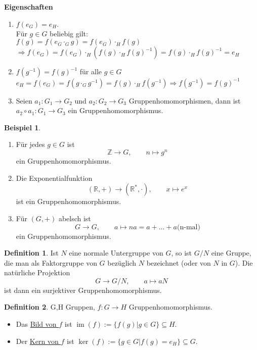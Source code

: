 \documentclass[12pt]{scrartcl}%
\theoremstyle{definition}
\newtheorem*{defn}{Definition}
\newtheorem{ex}{Beispiel}
\theoremstyle{remark}
\DeclareMathOperator\im{im}
\begin{document}
\textbf{Eigenschaften}
\begin{enumerate}
\item $f(e_G)=e_H.$\\
Für $g\in G$ beliebig gilt:\\
$f(g)=f(e_{G}\cdot_{G}g)=f(e_G)\cdot_{H}f(g)$\\
$\Rightarrow f(e_G)=f(e_G)\cdot_{H}(f(g)\cdot_{H}f(g)^{-1})=f(g)\cdot_{H}f(g)^{-1}=e_H$\\
\item $f(g^{-1})=f(g)^{-1}$ für alle $g\in G$\\
$e_H=f(e_G)=f(g\cdot_G g^{-1})=f(g)\cdot_{H}f(g^{-1}) \Rightarrow f(g^{-1})=f(g)^{-1}$\\
\item Seien $a_1: G_1\rightarrow G_2$ und $a_2: G_2\rightarrow G_3$ Gruppenhomomorphismen, 
dann ist $a_2\circ a_1: G_1\rightarrow G_3$ ein Gruppenhomomorphismus.
\end{enumerate}

\begin{ex}
\begin{enumerate}
\item Für jedes $g \in G$ ist
$$\mathbb{Z} \rightarrow G, \qquad n \mapsto g^n$$
ein Gruppenhomomorphismus.
\item Die Exponentialfunktion
$$(\mathbb{R},+)\rightarrow(\mathbb{R}^*,\cdot), \qquad x\mapsto e^x$$
ist ein Gruppenhomomorphismus.
\item Für $(G,+)$ abelsch ist %
$$G\rightarrow G, \qquad a\mapsto na = a+...+a \text{(n-mal)}$$
ein Gruppenhomomorphismus.
\end{enumerate}
\end{ex}

\begin{defn}
Ist $N$ eine normale Untergruppe von $G$, so ist $G/N$ eine Gruppe, die man als Faktorgruppe von $G$ bezüglich $N$ bezeichnet (oder von $N$ in $G$).
Die natürliche Projektion
$$G\rightarrow G/N, \qquad a\mapsto aN$$
ist dann ein surjektiver Gruppenhomomorphismus.
\end{defn}

\begin{defn}
	G,H Gruppen, $ f: G \rightarrow H$ Gruppenhomomorphismus.
	\begin{itemize}
	\item Das \underline{Bild von $f$} ist $\im(f) := \{f(g) | g \in G\} \subseteq H$.
	\item Der \underline{Kern von $f$} ist $\ker(f) := \{g \in G | f(g) = e_H\} \subseteq G$.
	\end{itemize}
\end{defn}
\end{document}
